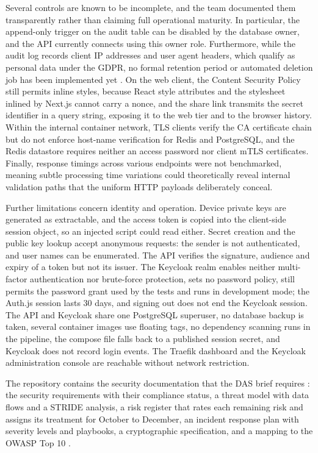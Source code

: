 \documentclass[12pt,a4paper]{article}
\numberwithin{equation}{section}
\numberwithin{figure}{section}
\numberwithin{table}{section}
\begin{document}
Several controls are known to be incomplete, and the team documented them transparently rather than claiming full operational maturity. In particular, the append-only trigger on the audit table can be disabled by the database owner, and the API currently connects using this owner role. Furthermore, while the audit log records client IP addresses and user agent headers, which qualify as personal data under the GDPR, no formal retention period or automated deletion job has been implemented yet \cite{gdpr}. On the web client, the Content Security Policy still permits inline styles, because React style attributes and the stylesheet inlined by Next.js cannot carry a nonce, and the share link transmits the secret identifier in a query string, exposing it to the web tier and to the browser history. Within the internal container network, TLS clients verify the CA certificate chain but do not enforce host-name verification for Redis and PostgreSQL, and the Redis datastore requires neither an access password nor client mTLS certificates. Finally, response timings across various endpoints were not benchmarked, meaning subtle processing time variations could theoretically reveal internal validation paths that the uniform HTTP payloads deliberately conceal.

Further limitations concern identity and operation. Device private keys are generated as extractable, and the access token is copied into the client-side session object, so an injected script could read either. Secret creation and the public key lookup accept anonymous requests: the sender is not authenticated, and user names can be enumerated. The API verifies the signature, audience and expiry of a token but not its issuer. The Keycloak realm enables neither multi-factor authentication nor brute-force protection, sets no password policy, still permits the password grant used by the tests and runs in development mode; the Auth.js session lasts 30 days, and signing out does not end the Keycloak session. The API and Keycloak share one PostgreSQL superuser, no database backup is taken, several container images use floating tags, no dependency scanning runs in the pipeline, the compose file falls back to a published session secret, and Keycloak does not record login events. The Traefik dashboard and the Keycloak administration console are reachable without network restriction.

The repository contains the security documentation that the DAS brief requires \cite{dasbrief}: the security requirements with their compliance status, a threat model with data flows and a STRIDE analysis, a risk register that rates each remaining risk and assigns its treatment for October to December, an incident response plan with severity levels and playbooks, a cryptographic specification, and a mapping to the OWASP Top 10 \cite{secretsharerepo}.
\end{document}
